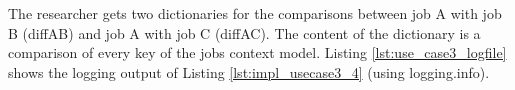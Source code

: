 \documentclass[draft,final]{vutinfth} %
\newenvironment{code}{\captionsetup{type=listing}}{}
\begin{document}
\begin{enumerate}
\begin{code}
	\end{code}

	The researcher gets two dictionaries for the comparisons between job A with job B (diffAB) and job A with job C (diffAC). The content of the dictionary is a comparison of every key of the jobs context model. Listing \ref{lst:use_case3_logfile} shows the logging output of Listing \ref{lst:impl_usecase3_4} (using logging.info).
\end{enumerate}

\newpage
\end{document}
